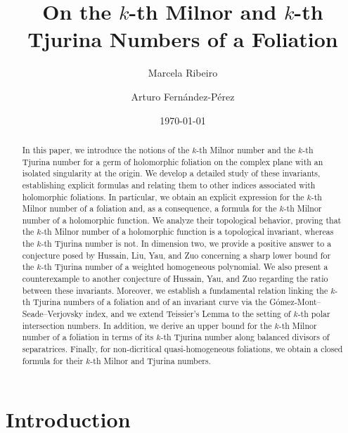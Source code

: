 \documentclass[12pt,letterpaper]{amsart}
\title{On the $k$-th Milnor and $k$-th Tjurina Numbers of a Foliation}
\date{\today}
\author{Marcela Ribeiro}
\author[A. Fern\'andez-P\'erez]{Arturo Fern\'andez-P\'erez}
\begin{document}

\begin{abstract}
In this paper, we introduce the notions of the $k$-th Milnor number and the $k$-th Tjurina number for a germ of holomorphic foliation on the complex plane with an isolated singularity at the origin. We develop a detailed study of these invariants, establishing explicit formulas and relating them to other indices associated with holomorphic foliations. In particular, we obtain an explicit expression for the $k$-th Milnor number of a foliation and, as a consequence, a formula for the $k$-th Milnor number of a holomorphic function. We analyze their topological behavior, proving that the $k$-th Milnor number of a holomorphic function is a topological invariant, whereas the $k$-th Tjurina number is not. In dimension two, we provide a positive answer to a conjecture posed by Hussain, Liu, Yau, and Zuo concerning a sharp lower bound for the $k$-th Tjurina number of a weighted homogeneous polynomial. We also present a counterexample to another conjecture of Hussain, Yau, and Zuo regarding the ratio between these invariants. Moreover, we establish a fundamental relation linking the $k$-th Tjurina numbers of a foliation and of an invariant curve via the G\'omez-Mont–Seade–Verjovsky index, and we extend Teissier’s Lemma to the setting of $k$-th polar intersection numbers. In addition, we derive an upper bound for the $k$-th Milnor number of a foliation in terms of its $k$-th Tjurina number along balanced divisors of separatrices. Finally, for non-dicritical quasi-homogeneous foliations, we obtain a closed formula for their $k$-th Milnor and Tjurina numbers.
\end{abstract}

\maketitle
\tableofcontents


\section{Introduction}
\end{document}
